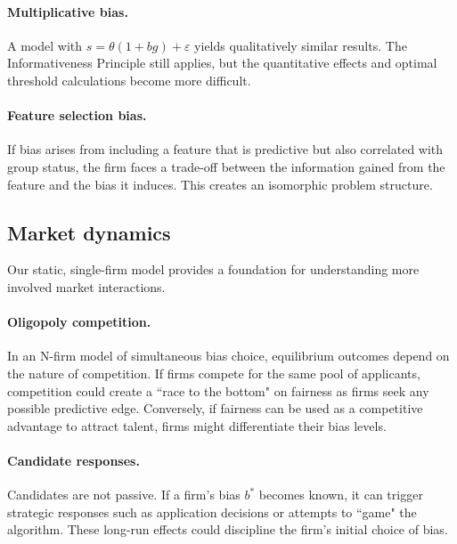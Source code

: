 \paragraph{Multiplicative bias.} A model with $s = \theta(1+bg) + \varepsilon$ yields qualitatively similar results. The Informativeness Principle still applies, but the quantitative effects and optimal threshold calculations become more difficult.

\paragraph{Feature selection bias.} If bias arises from including a feature that is predictive but also correlated with group status, the firm faces a trade-off between the information gained from the feature and the bias it induces. This creates an isomorphic problem structure.

\subsection{Market dynamics}
Our static, single-firm model provides a foundation for understanding more involved market interactions.

\paragraph{Oligopoly competition.} In an N-firm model of simultaneous bias choice, equilibrium outcomes depend on the nature of competition. If firms compete for the same pool of applicants, competition could create a ``race to the bottom" on fairness as firms seek any possible predictive edge. Conversely, if fairness can be used as a competitive advantage to attract talent, firms might differentiate their bias levels.

\paragraph{Candidate responses.} Candidates are not passive. If a firm's bias $b^*$ becomes known, it can trigger strategic responses such as application decisions or attempts to ``game" the algorithm. These long-run effects could discipline the firm's initial choice of bias.